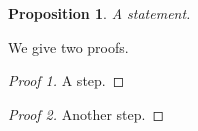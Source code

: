 \documentclass{article}
\newtheorem{prop}{Proposition}
\begin{document}
\begin{prop}
A statement.
\end{prop}
We give two proofs.
\begin{proof}[Proof 1]
A step.
\end{proof}

\begin{proof}[Proof 2]
Another step.
\end{proof}
\end{document}
